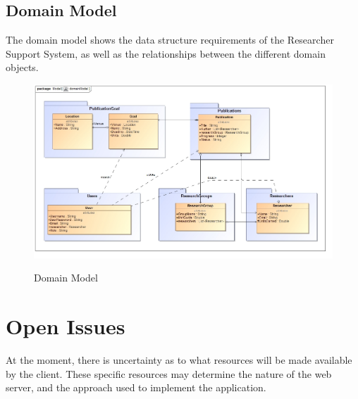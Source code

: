 \documentclass{article}
\begin{document}
	
	
\newpage

	\subsection{Domain Model}
	
	The domain model shows the data structure requirements of the Researcher Support System, as well as the relationships between the different domain objects. 

	\begin{figure}[H]
		\includegraphics[width=\textwidth]{domainModelB.jpg}  \\
		\caption{Domain Model}
	\end{figure}
	
\newpage

\section{Open Issues}

At the moment, there is uncertainty as to what resources will be made available by the client. These specific resources may determine the nature of the web server, and the approach used to implement the application.
\end{document}
